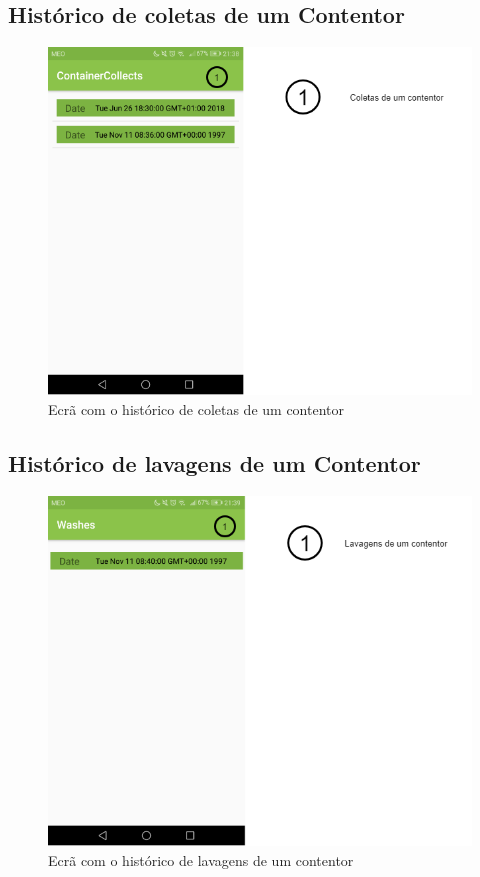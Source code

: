 \documentclass[10pt,a5paper]{article}
\begin{document}
\newpage
\subsection{Histórico de coletas de um Contentor} 

\begin{figure}[!h]
	\centering
	\includegraphics[width=1.1\textwidth]{Images/screens/container_collects}
	\caption{Ecrã com o histórico de coletas de um contentor}
	\label{fig:container_collects}
\end{figure}

\newpage
\subsection{Histórico de lavagens de um Contentor} 

\begin{figure}[!h]
	\centering
	\includegraphics[width=1.1\textwidth]{Images/screens/container_washes}
	\caption{Ecrã com o histórico de lavagens de um contentor}
	\label{fig:container_washes}
\end{figure}
\end{document}
